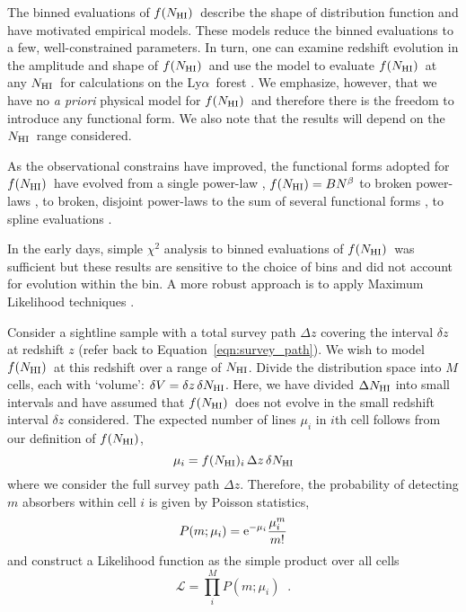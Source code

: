 \documentclass[graybox]{svmult}
\def\lya{Ly$\alpha$}
\newcommand{\mnhi}{N_{\rm HI}}
\newcommand{\nhi}{$\mnhi$}
\def\mfnhi{f(\mnhi)}
\def\fnhi{$\mfnhi$}
\def\prodl{\prod\limits}
\begin{document}
The binned evaluations of \fnhi\ describe the shape of 
distribution function and have motivated empirical
models. These models reduce the binned evaluations to a few, 
well-constrained parameters.  In turn, one can
examine redshift evolution in the amplitude and shape
of \fnhi\ and use the model to evaluate \fnhi\ at 
any \nhi\ for calculations on the \lya\ forest 
\cite[see below][]{madau_meiksin9X}.
We emphasize, however, that we have no {\it a priori}
physical model for \fnhi\ and therefore there is the
freedom to introduce any functional form.
We also note that the results will depend
on the \nhi\ range considered. 

As the observational constrains have improved, the
functional forms adopted for \fnhi\ have evolved from
a single power-law \cite{tytler87},
$\mfnhi = B N^\beta$
to broken power-laws \cite{petit93,pow10},
to broken, disjoint power-laws \cite{rudie13} 
to the sum of several functional forms \cite{inoue+14},
to spline evaluations \cite{pro+14}.

In the early days, simple $\chi^2$ analysis
to binned evaluations of \fnhi\
was sufficient but these results
are sensitive to the choice of bins and did
not account for evolution within the bin.
A more robust approach is to apply Maximum
Likelihood techniques \cite[][]{sim96,ctp+10}.

Consider a sightline sample with a total survey path $\Delta z$ 
covering the interval $\delta z$ at redshift $z$ (refer
back to Equation~\ref{eqn:survey_path}).
We wish to model \fnhi\ at this redshift over a
range of \nhi.  
Divide the distribution space into $M$ cells, each with 
`volume': $\delta V = \delta z \, \delta \mnhi$.
Here, we have divided $\Delta \mnhi$ into small intervals
and have assumed that \fnhi\ does not evolve in the small
redshift interval $\delta z$ considered.
The expected number of lines $\mu_i$ in $i$th cell
follows from our definition of \fnhi, 
\begin{equation}
\mu_i = f(\mnhi)_i \, \Delta z \, \delta\mnhi
\end{equation}
where we consider the full survey path $\Delta z$.
Therefore, the probability of detecting $m$ absorbers within 
cell $i$ is given by Poisson statistics,
\begin{equation}
P(m; \mu_i) = {\rm e}^{-\mu_i} \frac{\mu_i^m}{m!}
\end{equation}
and construct a Likelihood function as the 
simple product over all cells
\begin{equation}
\mathcal{L} = \prodl_i^M P(m; \mu_i) \;\; .
\end{equation}
\end{document}
